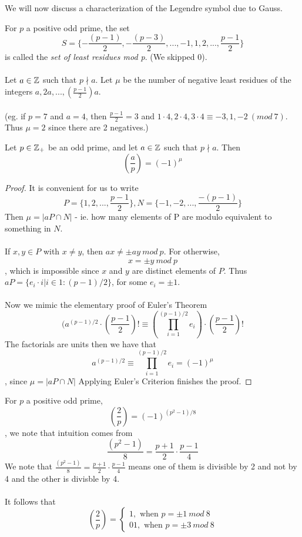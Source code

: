 We will now discuss a characterization of the Legendre symbol due to Gauss.

\begin{definition}
For $p$ a positive odd prime, the set 
\[S = \{-\frac{(p-1)}{2}, -\frac{(p-3)}{2}, ..., -1, 1, 2, ..., \frac{p-1}{2}\}\]
is called the \textit{set of least residues mod p}. (We skipped $0$).\\\\
Let $a \in \mathbb{Z}$ such that $p \nmid a$. Let $\mu$ be the number of negative least residues of the integers $a, 2a, ..., (\frac{p-1}{2})a$.\\\\
(eg. if $p = 7$ and $a = 4$, then $\frac{p-1}{2} = 3$ and $1 \cdot 4, 2 \cdot 4, 3 \cdot 4 \equiv -3, 1, -2\ (mod\ 7)$. Thus $\mu = 2$ since there are 2 negatives.)
\end{definition}

\begin{lemma}
Let $p \in \mathbb{Z}_+$ be an odd prime, and let $a \in \mathbb{Z}$ such that $p \nmid a$. Then
\[(\frac{a}{p}) = (-1)^\mu\]
\end{lemma}

\begin{proof}
It is convenient for us to write
\[P = \{1, 2, ..., \frac{p-1}{2}\}, N = \{-1, -2, ..., \frac{-(p-1)}{2}\}\]
Then $\mu = |aP \cap N|$ - ie. how many elements of P are modulo equivalent to something in $N$.\\\\
If $x, y \in P$ with $x \neq y$, then $ax \neq \pm ay\ mod\ p$. For otherwise, \[x = \pm y\ mod\ p\]
, which is impossible since $x$ and $y$ are distinct elements of $P$. Thus $aP = \{e_i \cdot i | i \in 1:(p-1)/2\}$, for some $e_i = \pm 1$.\\\\
Now we mimic the elementary proof of Euler's Theorem
\[(a^{(p-1)/2} \cdot (\frac{p-1}{2})! \equiv (\prod_{i = 1}^{(p-1)/2} e_i) \cdot (\frac{p-1}{2})!\]
The factorials are units then we have that
\[a^{(p-1)/2} \equiv \prod_{i=1}^{(p-1)/2} e_i = (-1)^{\mu}\]
, since $\mu = |aP \cap N|$ Applying Euler's Criterion finishes the proof.
\end{proof}

\begin{proposition}
For $p$ a positive odd prime, 
\[(\frac{2}{p}) = (-1)^{(p^2 - 1)/8}\]
, we note that intuition comes from
\[\frac{(p^2 - 1)}{8} = \frac{p+1}{2} \cdot \frac{p-1}{4}\]
We note that $\frac{(p^2 - 1)}{8} = \frac{p+1}{2} \cdot \frac{p-1}{4}$ means one of them is divisible by 2 and not by 4 and the other is divisble by 4.\\\\
It follows that 
\[(\frac{2}{p}) = \begin{cases}
1, \text{ when } p = \pm 1\ mod\ 8\\
01, \text{ when } p = \pm 3\ mod\ 8
\end{cases}\]
\end{proposition}

